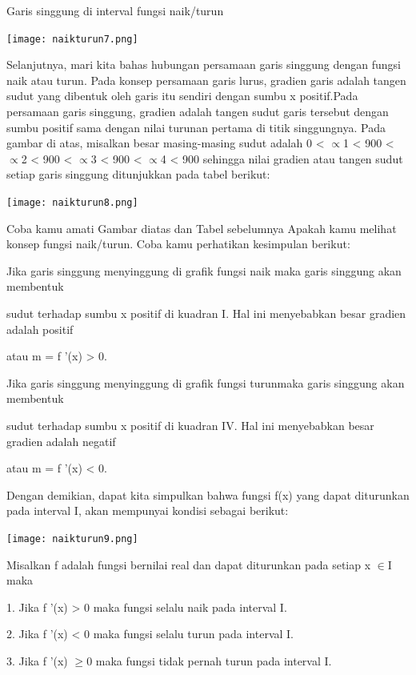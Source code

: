 \documentclass[11pt,fleqn]{book} %
\begin{document}
Garis singgung di interval fungsi naik/turun

\texttt{[image: naikturun7.png]}

Selanjutnya, mari kita bahas hubungan persamaan garis singgung dengan fungsi naik atau turun. Pada konsep
persamaan garis lurus, gradien garis adalah tangen sudut yang dibentuk oleh garis itu sendiri dengan sumbu x positif.Pada persamaan garis singgung, gradien adalah tangen sudut garis tersebut dengan sumbu positif sama dengan nilai turunan pertama di titik singgungnya. Pada gambar di atas, misalkan besar masing-masing sudut adalah 0 < $\propto $1 < 900 < $\propto $2 < 900 < $\propto $3 < 900 < $\propto $4 < 900 sehingga nilai
gradien atau tangen sudut setiap garis singgung ditunjukkan pada tabel berikut:

\begin{center}
\texttt{[image: naikturun8.png]}
\end{center}

Coba kamu amati Gambar diatas dan Tabel sebelumnya Apakah kamu melihat konsep fungsi naik/turun. Coba kamu perhatikan kesimpulan berikut:

Jika garis singgung menyinggung di grafik fungsi naik maka garis singgung akan membentuk 

sudut terhadap sumbu x positif di kuadran I. Hal ini menyebabkan besar gradien adalah positif 

atau m = f '(x) > 0.

Jika garis singgung menyinggung di grafik fungsi turunmaka garis singgung akan membentuk 

sudut terhadap sumbu x positif di kuadran IV. Hal ini menyebabkan besar gradien adalah negatif 

atau m = f '(x) < 0.

Dengan demikian, dapat kita simpulkan bahwa fungsi f(x) yang dapat diturunkan pada interval I, akan mempunyai kondisi sebagai berikut:

\begin{center}
\texttt{[image: naikturun9.png]}
\end{center}

Misalkan f adalah fungsi bernilai real dan dapat
diturunkan pada setiap x $\in $I maka

1. Jika f '(x) > 0 maka fungsi selalu naik pada interval I.

2. Jika f '(x) < 0 maka fungsi selalu turun pada interval I.

3. Jika f '(x) $\geqslant $0 maka fungsi tidak pernah turun pada interval I.
\end{document}
